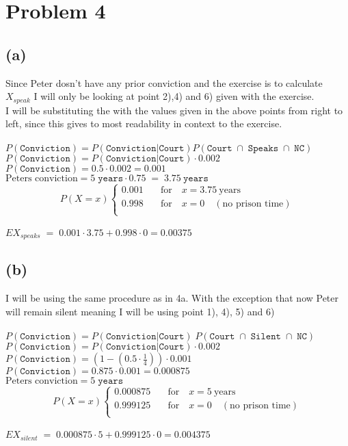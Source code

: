 \section{Problem 4}
\subsection{(a)}
Since Peter dosn't have any prior conviction and the exercise is to calculate $ X_{speak} $ I will
only be looking at point 2),4) and 6) given with the exercise.
\\
I will be substituting the with the values given in the above points from right to left, since this gives to most readability in context to the
exercise.
\\
\\
$ P(\mathtt{Conviction}) = P(\mathtt{Conviction} | \mathtt{Court}) P(\mathtt{Court}\; \cap\; \mathtt{Speaks}\; \cap\; \mathtt{NC}) $
\\
$ P(\mathtt{Conviction}) = P(\mathtt{Conviction} | \mathtt{Court}) \cdot 0.002 $
\\
$ P(\mathtt{Conviction}) = 0.5 \cdot 0.002 = 0.001 $
\\
$ \text{Peters conviction} = 5\; \mathtt{years} \cdot 0.75\; =\; 3.75\ \mathtt{years} $
\\
\[P(X = x) \begin{cases}
    0.001 & \quad \text{for} \quad x = 3.75\ \text{years} \\
    0.998 & \quad \text{for} \quad x = 0 \quad (\text{no prison time}) \\
 \end{cases}
\]
\\
$EX_{speaks}\; =\; 0.001 \cdot 3.75 + 0.998 \cdot 0 = 0.00375$

\subsection{(b)}
I will be using the same procedure as in 4a. With the exception that now Peter will remain silent meaning I
will be using point 1), 4), 5) and 6)
\\
\\
$ P(\mathtt{Conviction}) = P(\mathtt{Conviction} | \mathtt{Court})\; P(\mathtt{Court}\; \cap\; \mathtt{Silent}\; \cap\; \mathtt{NC}) $
\\
$ P(\mathtt{Conviction}) = P(\mathtt{Conviction} | \mathtt{Court}) \cdot 0.002 $
\\
$ P(\mathtt{Conviction}) = (1 - (0.5 \cdot \frac{1}{4})) \cdot 0.001 $
\\
$ P(\mathtt{Conviction}) = 0.875 \cdot 0.001 = 0.000875 $
\\
$ \text{Peters conviction} = 5\; \mathtt{years} $
\\
\[P(X = x) \begin{cases}
    0.000875 & \quad \text{for} \quad x = 5\ \text{years} \\
    0.999125 & \quad \text{for} \quad x = 0 \quad (\text{no prison time}) \\
 \end{cases}
\]
\\
$EX_{silent}\; =\; 0.000875 \cdot 5 + 0.999125 \cdot 0 = 0.004375$

